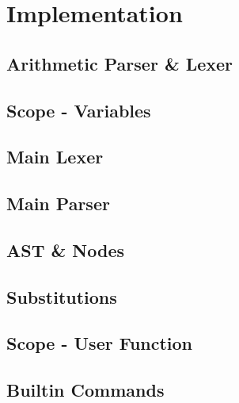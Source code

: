 \chapter{Implementation}




\section{Arithmetic Parser \& Lexer}

\section{Scope - Variables}

\section{Main Lexer}

\section{Main Parser}

\section{AST \& Nodes}

\section{Substitutions}

\section{Scope - User Function}

\section{Builtin Commands}

